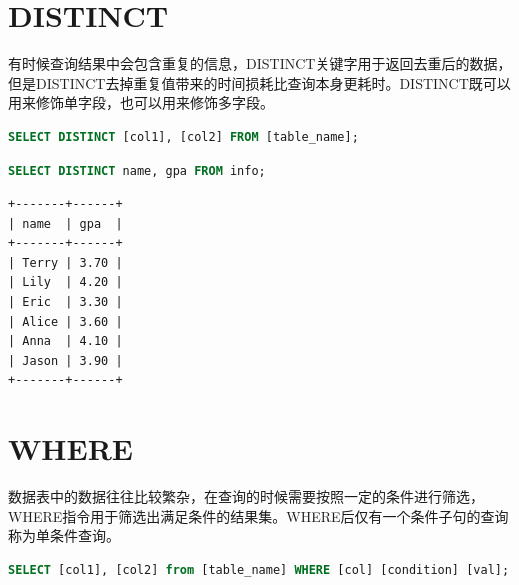 \documentclass[12pt, openany, oneside]{book}
\begin{document}
\section{DISTINCT}

有时候查询结果中会包含重复的信息，DISTINCT关键字用于返回去重后的数据，但是DISTINCT去掉重复值带来的时间损耗比查询本身更耗时。DISTINCT既可以用来修饰单字段，也可以用来修饰多字段。

\vspace{-0.5cm}

\begin{lstlisting}[language=SQL]
SELECT DISTINCT [col1], [col2] FROM [table_name];
\end{lstlisting}

\vspace{0.5cm}


\begin{lstlisting}[language=SQL]
SELECT DISTINCT name, gpa FROM info;
\end{lstlisting}

\begin{tcolorbox}
    \begin{verbatim}
+-------+------+
| name  | gpa  |
+-------+------+
| Terry | 3.70 |
| Lily  | 4.20 |
| Eric  | 3.30 |
| Alice | 3.60 |
| Anna  | 4.10 |
| Jason | 3.90 |
+-------+------+
    \end{verbatim}
\end{tcolorbox}

\section{WHERE}

数据表中的数据往往比较繁杂，在查询的时候需要按照一定的条件进行筛选，WHERE指令用于筛选出满足条件的结果集。WHERE后仅有一个条件子句的查询称为单条件查询。

\vspace{-0.5cm}

\begin{lstlisting}[language=SQL]
SELECT [col1], [col2] from [table_name] WHERE [col] [condition] [val];
\end{lstlisting}
\end{document}
